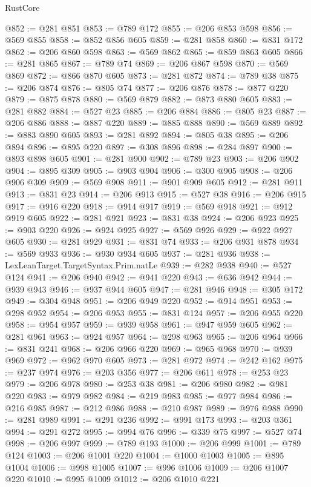 \begin{lexlean}{RustCore}
\begin{coremodule}
@852 := @281 @851
@853 := @789 @172
@855 := @206 @853 @598
@856 := @569 @855
@858 := @852 @856 @605
@859 := @281 @858
@860 := @831 @172
@862 := @206 @860 @598
@863 := @569 @862
@865 := @859 @863 @605
@866 := @281 @865
@867 := @789 @74
@869 := @206 @867 @598
@870 := @569 @869
@872 := @866 @870 @605
@873 := @281 @872
@874 := @789 @38
@875 := @206 @874
@876 := @805 @74
@877 := @206 @876
@878 := @877 @220
@879 := @875 @878
@880 := @569 @879
@882 := @873 @880 @605
@883 := @281 @882
@884 := @527 @23
@885 := @206 @884
@886 := @805 @23
@887 := @206 @886
@888 := @887 @220
@889 := @885 @888
@890 := @569 @889
@892 := @883 @890 @605
@893 := @281 @892
@894 := @805 @38
@895 := @206 @894
@896 := @895 @220
@897 := @308 @896
@898 := @284 @897
@900 := @893 @898 @605
@901 := @281 @900
@902 := @789 @23
@903 := @206 @902
@904 := @895 @309
@905 := @903 @904
@906 := @300 @905
@908 := @206 @906 @309
@909 := @569 @908
@911 := @901 @909 @605
@912 := @281 @911
@913 := @831 @23
@914 := @206 @913
@915 := @527 @38
@916 := @206 @915
@917 := @916 @220
@918 := @914 @917
@919 := @569 @918
@921 := @912 @919 @605
@922 := @281 @921
@923 := @831 @38
@924 := @206 @923
@925 := @903 @220
@926 := @924 @925
@927 := @569 @926
@929 := @922 @927 @605
@930 := @281 @929
@931 := @831 @74
@933 := @206 @931 @878
@934 := @569 @933
@936 := @930 @934 @605
@937 := @281 @936
@938 := LexLeanTarget.TargetSyntax.Prim.natLe
@939 := @282 @938
@940 := @527 @124
@941 := @206 @940
@942 := @941 @220
@943 := @636 @942
@944 := @939 @943
@946 := @937 @944 @605
@947 := @281 @946
@948 := @305 @172
@949 := @304 @948
@951 := @206 @949 @220
@952 := @914 @951
@953 := @298 @952
@954 := @206 @953
@955 := @831 @124
@957 := @206 @955 @220
@958 := @954 @957
@959 := @939 @958
@961 := @947 @959 @605
@962 := @281 @961
@963 := @924 @957
@964 := @298 @963
@965 := @206 @964
@966 := @831 @241
@968 := @206 @966 @220
@969 := @965 @968
@970 := @939 @969
@972 := @962 @970 @605
@973 := @281 @972
@974 := @242 @162
@975 := @237 @974
@976 := @203 @356
@977 := @206 @611
@978 := @253 @23
@979 := @206 @978
@980 := @253 @38
@981 := @206 @980
@982 := @981 @220
@983 := @979 @982
@984 := @219 @983
@985 := @977 @984
@986 := @216 @985
@987 := @212 @986
@988 := @210 @987
@989 := @976 @988
@990 := @281 @989
@991 := @291 @236
@992 := @991 @173
@993 := @203 @361
@994 := @291 @272
@995 := @994 @76
@996 := @339 @75
@997 := @527 @74
@998 := @206 @997
@999 := @789 @193
@1000 := @206 @999
@1001 := @789 @124
@1003 := @206 @1001 @220
@1004 := @1000 @1003
@1005 := @895 @1004
@1006 := @998 @1005
@1007 := @996 @1006
@1009 := @206 @1007 @220
@1010 := @995 @1009
@1012 := @206 @1010 @221

\end{coremodule}
\end{lexlean}
